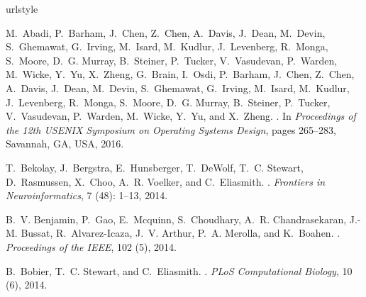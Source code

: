\documentclass{article}
\begin{document}
\begin{thebibliography}{29}
\providecommand{\natexlab}[1]{#1}
\providecommand{\url}[1]{\texttt{#1}}
\expandafter\ifx\csname urlstyle\endcsname\relax
  \providecommand{\doi}[1]{doi: #1}\else
  \providecommand{\doi}{doi: \begingroup \urlstyle{rm}\Url}\fi

M.~Abadi, P.~Barham, J.~Chen, Z.~Chen, A.~Davis, J.~Dean, M.~Devin,
  S.~Ghemawat, G.~Irving, M.~Isard, M.~Kudlur, J.~Levenberg, R.~Monga,
  S.~Moore, D.~G. Murray, B.~Steiner, P.~Tucker, V.~Vasudevan, P.~Warden,
  M.~Wicke, Y.~Yu, X.~Zheng, G.~Brain, I.~Osdi, P.~Barham, J.~Chen, Z.~Chen,
  A.~Davis, J.~Dean, M.~Devin, S.~Ghemawat, G.~Irving, M.~Isard, M.~Kudlur,
  J.~Levenberg, R.~Monga, S.~Moore, D.~G. Murray, B.~Steiner, P.~Tucker,
  V.~Vasudevan, P.~Warden, M.~Wicke, Y.~Yu, and X.~Zheng.
.
\newblock In \emph{{Proceedings of the 12th USENIX Symposium on Operating
  Systems Design}}, pages 265--283, Savannah, GA, USA, 2016.

T.~Bekolay, J.~Bergstra, E.~Hunsberger, T.~DeWolf, T.~C. Stewart, D.~Rasmussen,
  X.~Choo, A.~R. Voelker, and C.~Eliasmith.
.
\newblock \emph{Frontiers in Neuroinformatics}, 7 (48):
  1--13, 2014.

B.~V. Benjamin, P.~Gao, E.~Mcquinn, S.~Choudhary, A.~R. Chandrasekaran, J.-M.
  Bussat, R.~Alvarez-Icaza, J.~V. Arthur, P.~A. Merolla, and K.~Boahen.
.
\newblock \emph{Proceedings of the IEEE}, 102 (5), 2014.

B.~Bobier, T.~C. Stewart, and C.~Eliasmith.
.
\newblock \emph{PLoS Computational Biology}, 10 (6), 2014.


\end{thebibliography}
\end{document}
